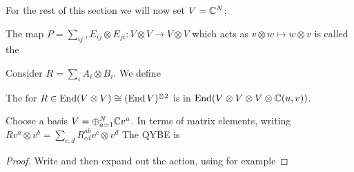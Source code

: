 \documentclass{article}
\begin{document}
For the rest of this section we will now set $V = \mathbb{C}^N$;

\begin{definition}
The map $P = \sum_{ij}, E_{ij} \otimes E_{ji} : V \otimes V \to V \otimes V$ which acts as $ v \otimes w \mapsto w \otimes v$ is called the 
\end{definition}

Consider $R = \sum_i A_i \otimes B_i$. We define 
\begin{definition}
The  for $R\in \operatorname{End}(V \otimes V) \cong (\operatorname{End} V)^{\otimes 2}$ is 
in $\operatorname{End}(V \otimes V \otimes V \otimes \mathbb{C}(u,v))$. 
\end{definition}

\begin{prop}
Choose a basis $V = \oplus_{a=1}^N \mathbb{C} v^a$. In terms of matrix elements, writing $R v^a \otimes v^b = \sum_{c,d} R^{ab}_{cd} v^c \otimes v^d$ The QYBE is 
\end{prop}
\begin{proof}
Write 
and then expand out the action, using for example 
\end{proof}
\end{document}
